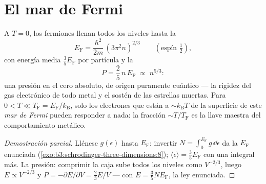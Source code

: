 \section{El mar de Fermi}

\begin{theorem}\label{thm:b3:quantum-statistics:fermi}
A $T = 0$, los fermiones llenan todos los niveles hasta la \emph{}
\[
E_{\text{F}} = \frac{\hbar^2}{2m}\,(3\pi^2n)^{2/3}
\qquad (\text{espín } \tfrac12) ,
\]
con energía media $\tfrac35 E_{\text{F}}$ por partícula y la
\emph{}
\[
P = \frac25\,n\,E_{\text{F}} \;\propto\; n^{5/3} :
\]
una presión en el cero absoluto, de origen puramente cuántico --- la
rigidez del gas electrónico de todo metal y el sostén de las estrellas
muertas. Para $0 < T \ll T_{\text{F}} = E_{\text{F}}/k_{\text{B}}$,
solo los electrones que están a $\sim k_{\text{B}}T$ de la superficie de
este \emph{mar de Fermi} pueden responder a nada: la fracción
$\sim T/T_{\text{F}}$ es la llave maestra del comportamiento metálico.
\end{theorem}

\begin{proof}[Demostración parcial]
Llénese $g(\epsilon)$ hasta $E_{\text{F}}$: invertir $N = \int_0^{
E_{\text{F}}}g\,\dd\epsilon$ da la $E_{\text{F}}$ enunciada
(\cref{exo:b3:schrodinger-three-dimensions:8}); $\langle\epsilon
\rangle = \tfrac35 E_{\text{F}}$ con una integral más. La presión:
comprimir la caja sube todos los niveles como $V^{-2/3}$, luego $E
\propto V^{-2/3}$ y $P = -\partial E/\partial V = \tfrac23 E/V$
--- con $E = \tfrac35 NE_{\text{F}}$, la ley enunciada.
\end{proof}

